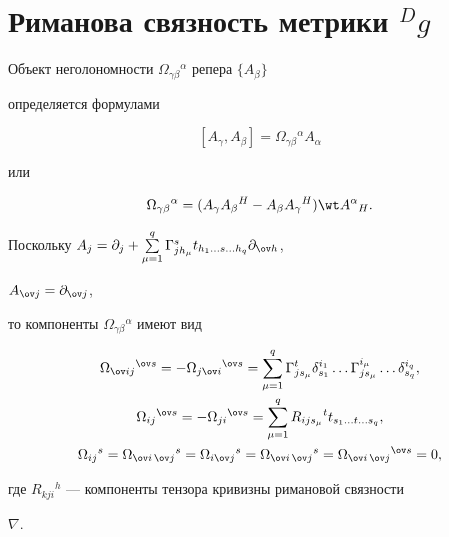 \section{Риманова связность метрики ${}^{D}g$}





Объект неголономности $\Omega_{\gamma\beta}{}^\alpha$ репера $\{A_\beta\}$


определяется формулами


$$


[A_\gamma,A_\beta]=\Omega_{\gamma\beta}{}^\alpha A_\alpha


$$


или


$$


\Omega_{\gamma\beta}{}^\alpha=(A_\gamma A_\beta{}^H-A_\beta


A_\gamma{}^H)\wt A{}^\alpha{}_H.


$$


Поскольку $A_j=\partial_j+\sum\limits^q_{\mu=1}\Gamma^s_{jh_\mu}


t_{h_1\dotsc s\dotsc h_q}\partial_{\ov h}$,


$A_{{\ov j}}=\partial_{{\ov j}}$,


то компоненты $\Omega_{\gamma\beta}{}^\alpha$ имеют вид


\begin{gather}


\Omega_{{\ov i}j}{}^{\ov s}=-\Omega_{j{\ov i}}{}^{\ov s}


=\sum^q_{\mu=1}\Gamma^t_{js_\mu}\delta^{i_1}_{s_1}\dotsc


\Gamma^{i_\mu}_{js_\mu}\dotsc \delta^{i_q}_{s_q},\notag \\


%


\Omega_{ij}{}^{\ov s}=-\Omega_{ji}{}^{\ov s}=


\sum^q_{\mu=1}R_{ijs_\mu}{}^t t_{s_1\dotsc t\dotsc s_q}, \\


%


\Omega_{ij}{}^s=\Omega_{{\ov i}\,{\ov j}}{}^s=\Omega_{i{\ov j}}{}^s=


\Omega_{{\ov i}\,{\ov j}}{}^s=\Omega_{{\ov i}\,{\ov j}}{}^{\ov s}=0,\notag


\end{gather}


где  $R_{kji}{}^h$ --- компоненты тензора кривизны римановой связности


$\nabla$.





